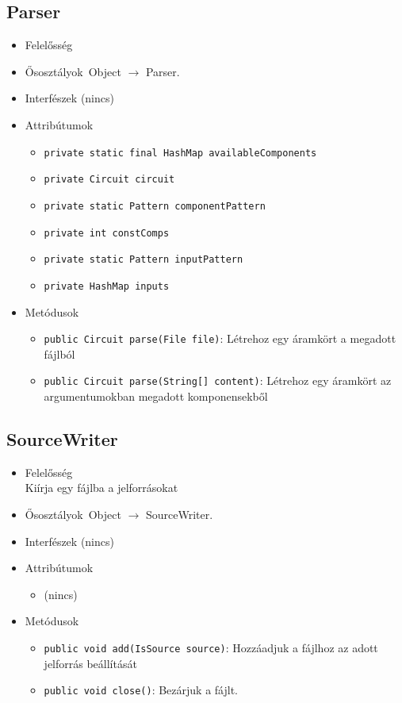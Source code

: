 \subsection{Parser}
\begin{itemize}
\item Felelősség\\

\item Ősosztályok\ Object $\rightarrow{}$ Parser.
\item Interfészek (nincs)
\item Attribútumok $\ $
\begin{itemize}
	\item \texttt{private static final HashMap availableComponents} 
	\item \texttt{private Circuit circuit} 
	\item \texttt{private static Pattern componentPattern} 
	\item \texttt{private int constComps} 
	\item \texttt{private static Pattern inputPattern} 
	\item \texttt{private HashMap inputs} 
\end{itemize}
\item Metódusok$\ $
\begin{itemize}
	\item \texttt{public Circuit parse(File file)}: Létrehoz egy áramkört a megadott fájlból
	\item \texttt{public Circuit parse(String[] content)}: Létrehoz egy áramkört az argumentumokban megadott komponensekből
\end{itemize}
\end{itemize}

\subsection{SourceWriter}
\begin{itemize}
\item Felelősség\\
Kiírja egy fájlba a jelforrásokat
\item Ősosztályok\ Object $\rightarrow{}$ SourceWriter.
\item Interfészek (nincs)
\item Attribútumok $\ $
\begin{itemize}
\item (nincs)
\end{itemize}
\item Metódusok$\ $
\begin{itemize}
	\item \texttt{public void add(IsSource source)}: Hozzáadjuk a fájlhoz az adott jelforrás beállítását
	\item \texttt{public void close()}: Bezárjuk a fájlt.
\end{itemize}
\end{itemize}

